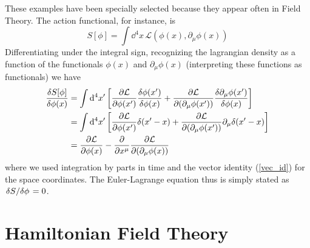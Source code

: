 These examples have been specially selected because they appear often in Field Theory. The action functional, for instance, is
\begin{equation}
    S[\phi]=\int\dd^4x\,\mathcal{L}(\phi(x),\partial_\mu\phi(x))
\end{equation}
Differentiating under the integral sign, recognizing the lagrangian density as a function of the functionals $\phi(x)$ and $\partial_\mu\phi(x)$ (interpreting these functions as functionals) we have
\begin{equation}
\begin{aligned}
    \fdv{S[\phi]}{\phi(x)}&=\int\dd^4x^\prime\,\qty[\pdv{\mathcal{L}}{\phi(x^\prime)}\fdv{\phi(x^\prime)}{\phi(x)}+\pdv{\mathcal{L}}{(\partial_\mu\phi(x^\prime))}\fdv{\partial_\mu\phi(x^\prime)}{\phi(x)}]\\
    &=\int\dd^4x^\prime\,\qty[\pdv{\mathcal{L}}{\phi(x^\prime)}\delta(x^\prime-x)+\pdv{\mathcal{L}}{(\partial_\mu\phi(x^\prime))}\partial_\mu\delta(x^\prime-x)]\\
    &=\pdv{\mathcal{L}}{\phi(x)}-\pdv{x^\mu}\pdv{\mathcal{L}}{(\partial_\mu\phi(x))}
\end{aligned}
\end{equation}
where we used integration by parts in time and the vector identity (\ref{vec_id}) for the space coordinates. The Euler-Lagrange equation thus is simply stated as $\fdv*{S}{\phi}=0$.

\section{Hamiltonian Field Theory}

